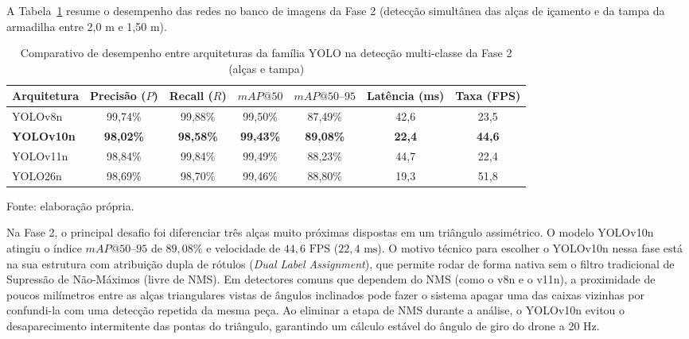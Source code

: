 A Tabela~\ref{tab:comparativo_yolo_fase2_resultados} resume o desempenho das redes no banco de imagens da Fase 2 (detecção simultânea das alças de içamento e da tampa da armadilha entre 2,0 m e 1,50 m).

\begin{table}[H]
	\centering
	\footnotesize
	\setlength{\tabcolsep}{3.5pt}
	\captionsetup{justification=centering}
	\caption{Comparativo de desempenho entre arquiteturas da família YOLO na detecção multi-classe da Fase 2 (alças e tampa)}
	\label{tab:comparativo_yolo_fase2_resultados}
	\vspace{0.2cm}
	\begin{tabular}{lcccccc}
		\hline
		\textbf{Arquitetura} & \textbf{Precisão ($P$)} & \textbf{Recall ($R$)} & \textbf{$mAP@50$} & \textbf{$mAP@50\text{--}95$} & \textbf{Latência (ms)} & \textbf{Taxa (FPS)} \\
		\hline
		YOLOv8n    & 99,74\%      & 99,88\%    & 99,50\%    & 87,49\%         & 42,6           & 23,5 \\
		\textbf{YOLOv10n} & \textbf{98,02\%} & \textbf{98,58\%} & \textbf{99,43\%} & \textbf{89,08\%} & \textbf{22,4} & \textbf{44,6} \\
		YOLOv11n   & 98,84\%      & 99,84\%    & 99,49\%    & 88,23\%         & 44,7           & 22,4 \\
		YOLO26n    & 98,69\%      & 98,70\%    & 99,46\%    & 88,80\%         & 19,3           & 51,8 \\
		\hline
	\end{tabular}
	\vspace{0.2cm}
	\begin{flushleft}
		\footnotesize Fonte: elaboração própria.
	\end{flushleft}
\end{table}

Na Fase 2, o principal desafio foi diferenciar três alças muito próximas dispostas em um triângulo assimétrico. O modelo YOLOv10n atingiu o índice $mAP@50\text{--}95$ de $89,08\%$ e velocidade de $44,6\text{ FPS}$ ($22,4\text{ ms}$). O motivo técnico para escolher o YOLOv10n nessa fase está na sua estrutura com atribuição dupla de rótulos (\textit{Dual Label Assignment}), que permite rodar de forma nativa sem o filtro tradicional de Supressão de Não-Máximos (livre de NMS). Em detectores comuns que dependem do NMS (como o v8n e o v11n), a proximidade de poucos milímetros entre as alças triangulares vistas de ângulos inclinados pode fazer o sistema apagar uma das caixas vizinhas por confundi-la com uma detecção repetida da mesma peça. Ao eliminar a etapa de NMS durante a análise, o YOLOv10n evitou o desaparecimento intermitente das pontas do triângulo, garantindo um cálculo estável do ângulo de giro do drone a 20 Hz.

